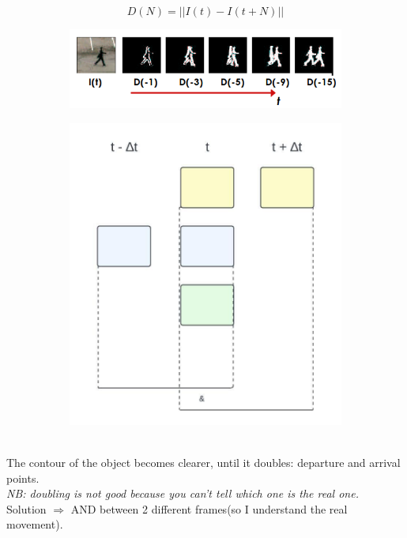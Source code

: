 \[D(N) = ||I(t)-I(t+N)||\]
\begin{figure}[h]
    \begin{subfigure}{0.6\textwidth}
        \includegraphics[scale=0.5]{Figures/FrameDifferencing.png} 
    \end{subfigure}
    \begin{subfigure}{0.4\textwidth}
        \includegraphics[scale=0.5]{Figures/DifferencingDiagram.jpeg}    \end{subfigure}
        \label{fig:image2}
\end{figure}\\
The contour of the object becomes clearer, until it doubles: departure and arrival points.
\\\textit{NB: doubling is not good because you can't tell which one is the real one.}
\\Solution $\Rightarrow$ AND between 2 different frames(so I understand the real movement).
